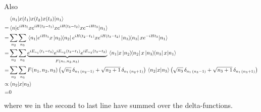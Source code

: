 \documentclass[a4paper,11pt]{article}
\begin{document}
Also
\begin{equation}
\begin{aligned}
&\mel{n_1}{x(t_1)x(t_2)x(t_3)}{n_1}\\
=&\mel{n}{e^{iHt_1}xe^{iH(t_2-t_1)}xe^{iH(t_3-t_2)}xe^{-iHt_3}}{n_1}\\
=&\sum_{n_2}\sum_{n_3}\mel{n_1}{e^{iHt_1}x\dyad{n_2}{n_2}e^{iH(t_2-t_1)}xe^{iH(t_3-t_2)}\dyad{n_3}{n_3}xe^{-iHt_3}}{n_1}
\\
=&\sum_{n_2}\sum_{n_3}\underbrace{e^{iE_{n_1}(t_1-t_3)}e^{iE_{n_2}(t_2-t_1)}e^{iE_{n_3}(t_3-t_2)}}_{F(n_1,n_2,n_3)}\mel{n_1}{x\dyad{n_2}{n_2}x\dyad{n_3}{n_3}x}{n_1}
\\
=&\sum_{n_2}\sum_{n_3}F(n_1,n_2,n_3)\left(\sqrt{n_2}\,\delta_{n_1\,(n_2-1)}+\sqrt{n_2+1}\,\delta_{n_1\,(n_2+1)}\right)\mel{n_2}{x}{n_3}\left(\sqrt{n_3}\,\delta_{n_1\,(n_3-1)}+\sqrt{n_3+1}\,\delta_{n_1\,(n_3+1)}\right)\\
\propto&\mel{n_2}{x}{n_2}\\
=&0
\end{aligned}
\end{equation}
where we in the second to last line have summed over the delta-functions.
\newpage
\end{document}
